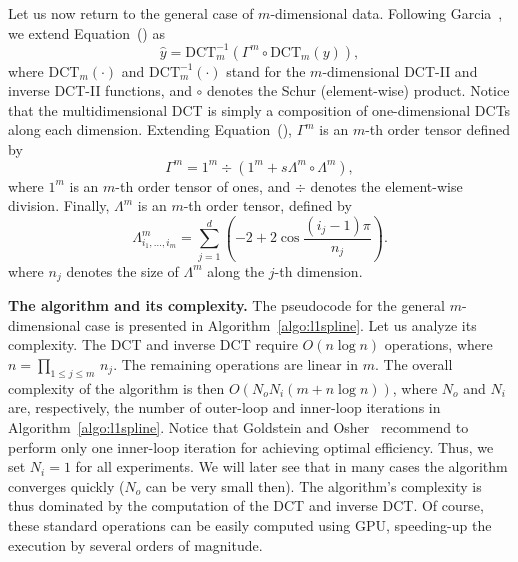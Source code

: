 \documentclass[preprint]{imsart}
\newcommand{\funct}[1]{\mathrm{#1}}
\begin{document}
Let us now return to the general case of $m$-dimensional data. Following Garcia~\cite{garcia10}, we extend Equation~() as
\begin{equation}
    \hat{y} = \funct{DCT}^{-1}_m \left( \varGamma^m \circ \funct{DCT}_m (y) \right) ,
    \label{eq:LSsolutionDCTd}
\end{equation}
where $\funct{DCT}_m(\cdot)$ and $\funct{DCT}^{-1}_m(\cdot)$ stand for the $m$-dimensional DCT-II and inverse DCT-II functions, and $\circ$ denotes the Schur (element-wise) product. Notice that the multidimensional DCT is simply a composition of one-dimensional DCTs along each dimension. Extending Equation~(), $\varGamma^m$ is  an $m$-th order tensor defined by
\begin{equation}
    \varGamma^m = 1^m  \div \left( 1^m + s \varLambda^m \circ \varLambda^m \right) ,
    \label{eq:varGammad}
\end{equation}
where $1^m$ is an $m$-th order tensor of ones, and $\div$ denotes the element-wise division.
Finally, $\varLambda^m$ is an $m$-th order tensor, defined by
\begin{equation}
    \varLambda^m_{i_1, \dots, i_m} = \sum_{j=1}^{d} \left(  -2 + 2 \cos \frac{(i_j - 1) \pi}{n_j} \right) .
    \label{eq:varLambdad}
\end{equation}
where $n_j$ denotes the size of $\varLambda^m$ along the $j$-th dimension.

\medskip

\noindent\textbf{The algorithm and its complexity.}
The pseudocode for the general $m$-dimensional case is presented in Algorithm~\ref{algo:l1spline}. Let us analyze its complexity.
The DCT and inverse DCT require $O(n \log n)$ operations, where $n=\prod_{1 \leq j \leq m} \, n_j$. The remaining operations are linear in $m$. The overall complexity of the algorithm is then $O \left( N_o N_i (m + n \log n) \right)$, where $N_o$ and $N_i$ are, respectively, the number of outer-loop and inner-loop iterations in Algorithm~\ref{algo:l1spline}. Notice that Goldstein and Osher~\cite{goldstein09} recommend to perform only one inner-loop iteration for achieving optimal efficiency. Thus, we set $N_i = 1$ for all experiments.
We will later see that in many cases the algorithm converges quickly ($N_o$ can be very small then).
The algorithm's complexity is thus dominated by the computation of the DCT and inverse DCT. Of course, these standard operations can be easily computed using GPU, speeding-up the execution by several orders of magnitude.
\end{document}
